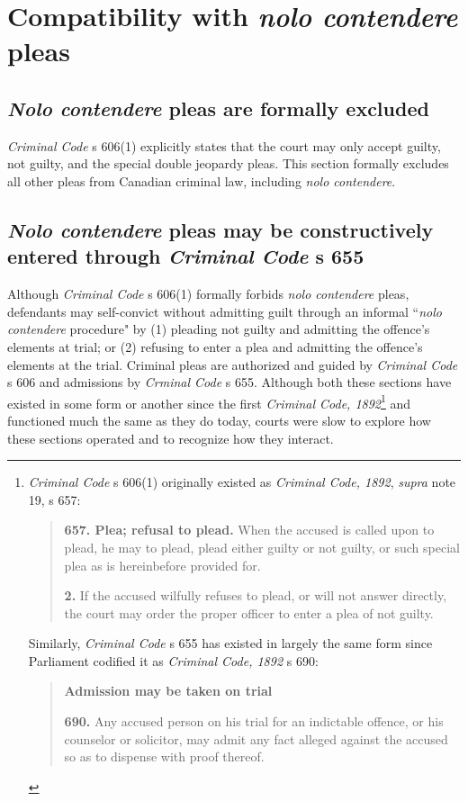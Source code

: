 \section{Compatibility with \textit{nolo contendere} pleas}

\subsection{\textit{Nolo contendere} pleas are formally excluded}

\textit{Criminal Code} s 606(1) explicitly states that the court may only accept guilty, not guilty, and the special double jeopardy pleas. This section formally excludes all other pleas from Canadian criminal law, including \textit{nolo contendere}. 

\subsection{\textit{Nolo contendere} pleas may be constructively entered through \textit{Criminal Code} s 655}

Although \textit{Criminal Code} s 606(1) formally forbids \textit{nolo contendere} pleas, defendants may self-convict without admitting guilt through an informal ``\textit{nolo contendere} procedure" by (1) pleading not guilty and admitting the offence's elements at trial; or (2) refusing to enter a plea and admitting the offence's elements at the trial. Criminal pleas are authorized and guided by \textit{Criminal Code} s 606 and admissions by \textit{Crminal Code} s 655. Although both these sections have existed in some form or another since the first \textit{Criminal Code, 1892}\footnote{\textit{Criminal Code} s 606(1) originally existed as \textit{Criminal Code, 1892}, \textit{supra} note 19, s 657:

\begin{quote}
\textbf{657. Plea; refusal to plead.} When the accused is called upon to plead, he may to plead, plead either guilty or not guilty, or such special plea as is hereinbefore provided for.

\textbf{2.} If the accused wilfully refuses to plead, or will not answer directly, the court may order the proper officer to enter a plea of not guilty. 
\end{quote}

Similarly, \textit{Criminal Code} s 655 has existed in largely the same form since Parliament codified it as \textit{Criminal Code, 1892} s 690:
\begin{quote}
    \textbf{Admission may be taken on trial}
    
    \textbf{690.} Any accused person on his trial for an indictable offence, or his counselor or solicitor, may admit any fact alleged against the accused so as to dispense with proof thereof.
\end{quote}
} and functioned much the same as they do today, courts were slow to explore how these sections operated and to recognize how they interact.


